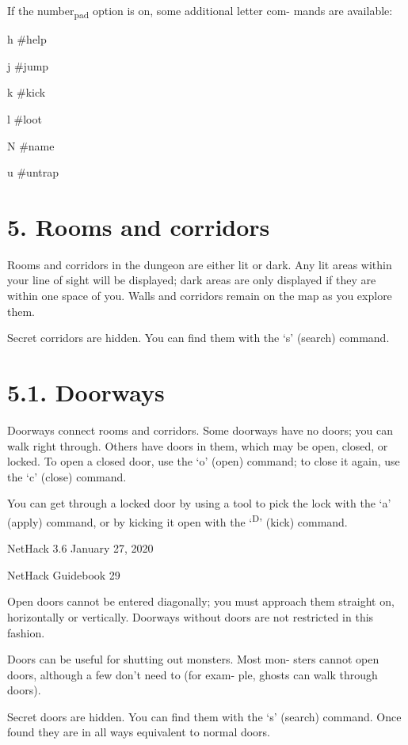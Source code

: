 \documentclass[11pt]{article}
\begin{document}
   If the number\textsubscript{pad} option is on, some additional letter com-
mands are available:

h  \#help

j  \#jump

k  \#kick

l  \#loot

N  \#name

u  \#untrap

\section{5. Rooms and corridors}
\label{sec:org9173b22}

   Rooms and corridors in the dungeon are either lit or dark.
Any lit areas within your line of sight will be displayed; dark
areas are only displayed if they are within one space of you.
Walls and corridors remain on the map as you explore them.

   Secret corridors are hidden. You can find them with the `s'
(search) command.


\section{5.1. Doorways}
\label{sec:orgbeb0541}

   Doorways connect rooms and corridors. Some doorways have no
doors; you can walk right through. Others have doors in them,
which may be open, closed, or locked. To open a closed door, use
the `o' (open) command; to close it again, use the `c' (close)
command.

   You can get through a locked door by using a tool to pick
the lock with the `a' (apply) command, or by kicking it open with
the `\textsuperscript{D}' (kick) command.


NetHack 3.6                   January 27, 2020





NetHack Guidebook                       29



   Open doors cannot be entered diagonally; you must approach
them straight on, horizontally or vertically.  Doorways without
doors are not restricted in this fashion.

   Doors can be useful for shutting out monsters. Most mon-
sters cannot open doors, although a few don't need to (for exam-
ple, ghosts can walk through doors).

   Secret doors are hidden.  You can find them with the `s'
(search) command. Once found they are in all ways equivalent to
normal doors.
\end{document}

